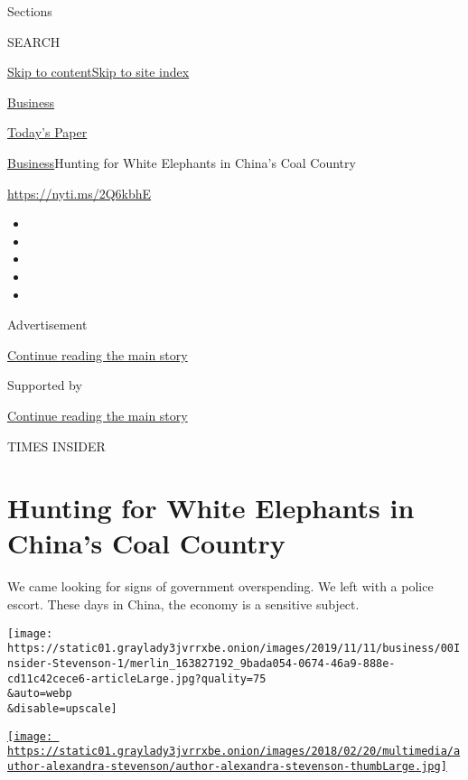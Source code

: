 Sections

SEARCH

\protect\hyperlink{site-content}{Skip to
content}\protect\hyperlink{site-index}{Skip to site index}

\href{https://www.nytimes3xbfgragh.onion/section/business}{Business}

\href{https://myaccount.nytimes3xbfgragh.onion/auth/login?response_type=cookie\&client_id=vi}{}

\href{https://www.nytimes3xbfgragh.onion/section/todayspaper}{Today's
Paper}

\href{/section/business}{Business}\textbar{}Hunting for White Elephants
in China's Coal Country

\url{https://nyti.ms/2Q6kbhE}

\begin{itemize}
\item
\item
\item
\item
\item
\end{itemize}

Advertisement

\protect\hyperlink{after-top}{Continue reading the main story}

Supported by

\protect\hyperlink{after-sponsor}{Continue reading the main story}

TIMES INSIDER

\hypertarget{hunting-for-white-elephants-in-chinas-coal-country}{%
\section{Hunting for White Elephants in China's Coal
Country}\label{hunting-for-white-elephants-in-chinas-coal-country}}

We came looking for signs of government overspending. We left with a
police escort. These days in China, the economy is a sensitive subject.

\texttt{[image: https://static01.graylady3jvrrxbe.onion/images/2019/11/11/business/00Insider-Stevenson-1/merlin\_163827192\_9bada054-0674-46a9-888e-cd11c42cece6-articleLarge.jpg?quality=75\\\&auto=webp\\\&disable=upscale]}

\href{https://www.nytimes3xbfgragh.onion/by/alexandra-stevenson}{\texttt{[image: https://static01.graylady3jvrrxbe.onion/images/2018/02/20/multimedia/author-alexandra-stevenson/author-alexandra-stevenson-thumbLarge.jpg]}}


